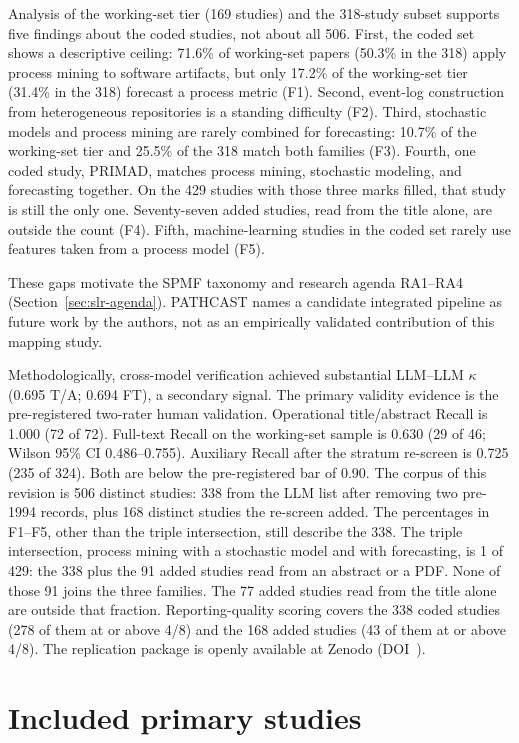 Analysis of the working-set tier (169 studies) and the 318-study subset
supports five findings about the coded studies, not about all 506. First,
the coded set shows a descriptive ceiling: 71.6\% of working-set papers
(50.3\% in the 318) apply process mining to software artifacts, but only
17.2\% of the working-set tier (31.4\% in the 318) forecast a process metric
(F1). Second, event-log construction from heterogeneous repositories is a
standing difficulty (F2). Third, stochastic models and process mining are
rarely combined for forecasting: 10.7\% of the working-set tier and 25.5\%
of the 318 match both families (F3). Fourth, one coded study, PRIMAD, matches
process mining, stochastic modeling, and forecasting together. On the 429
studies with those three marks filled, that study is still the only one.
Seventy-seven added studies, read from the title alone, are outside the
count (F4). Fifth,
machine-learning studies in the coded set rarely use features taken from a
process model (F5).

These gaps motivate the SPMF taxonomy and research agenda RA1--RA4
(Section~\ref{sec:slr-agenda}). PATHCAST names a candidate integrated
pipeline as future work by the authors, not as an empirically validated
contribution of this mapping study.

Methodologically, cross-model verification achieved substantial LLM--LLM
$\kappa$ (0.695 T/A; 0.694 FT), a secondary signal. The primary validity
evidence is the pre-registered two-rater human validation. Operational
title/abstract Recall is 1.000 (72 of 72). Full-text Recall on the
working-set sample is 0.630 (29 of 46; Wilson 95\% CI 0.486--0.755).
Auxiliary Recall after the stratum re-screen is 0.725 (235 of 324). Both
are below the pre-registered bar of 0.90. The corpus of this revision is
506 distinct studies: 338 from the LLM list after removing two pre-1994
records, plus 168 distinct studies the re-screen added. The percentages in
F1--F5, other than the triple intersection, still describe the 338. The
triple intersection, process mining with a stochastic model and with
forecasting, is 1 of 429: the 338 plus the 91 added studies read from an
abstract or a PDF. None of those 91 joins the three families. The 77 added
studies read from the title alone are outside that fraction. Reporting-quality scoring
covers the 338 coded studies (278 of them at or above 4/8) and the 168
added studies (43 of them at or above 4/8). The replication
package is openly available at Zenodo (DOI~\zenododoi).

\appendix
\section{Included primary studies}
\label{app:included}

